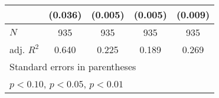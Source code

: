 {\begin{tabular}{l*{4}{c}}
            &     (0.036)         &     (0.005)         &     (0.005)         &     (0.009)         \\
\hline
\(N\)       &         935         &         935         &         935         &         935         \\
adj. \(R^{2}\)&       0.640         &       0.225         &       0.189         &       0.269         \\
\hline\hline
\multicolumn{5}{l}{\footnotesize Standard errors in parentheses}\\
\multicolumn{5}{l}{\footnotesize \sym{*} \(p<0.10\), \sym{**} \(p<0.05\), \sym{***} \(p<0.01\)}\\
\end{tabular}
}
